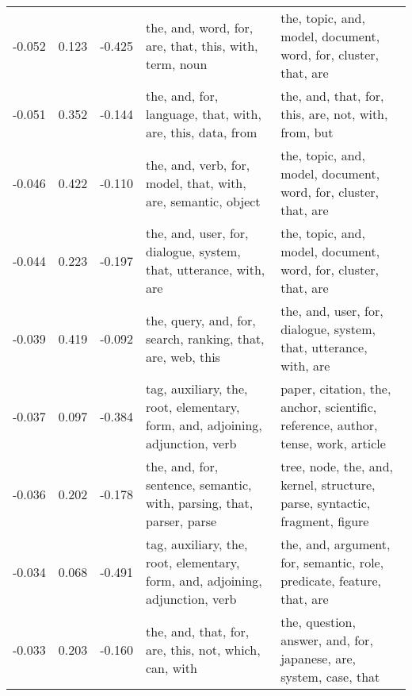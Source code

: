 \begin{tabular}{cccp{5cm}p{5cm}}
-0.052 & 0.123 & -0.425 & the, and, word, for, are, that, this, with, term, noun & the, topic, and, model, document, word, for, cluster, that, are \\
-0.051 & 0.352 & -0.144 & the, and, for, language, that, with, are, this, data, from & the, and, that, for, this, are, not, with, from, but \\
-0.046 & 0.422 & -0.110 & the, and, verb, for, model, that, with, are, semantic, object & the, topic, and, model, document, word, for, cluster, that, are \\
-0.044 & 0.223 & -0.197 & the, and, user, for, dialogue, system, that, utterance, with, are & the, topic, and, model, document, word, for, cluster, that, are \\
-0.039 & 0.419 & -0.092 & the, query, and, for, search, ranking, that, are, web, this & the, and, user, for, dialogue, system, that, utterance, with, are \\
-0.037 & 0.097 & -0.384 & tag, auxiliary, the, root, elementary, form, and, adjoining, adjunction, verb & paper, citation, the, anchor, scientific, reference, author, tense, work, article \\
-0.036 & 0.202 & -0.178 & the, and, for, sentence, semantic, with, parsing, that, parser, parse & tree, node, the, and, kernel, structure, parse, syntactic, fragment, figure \\
-0.034 & 0.068 & -0.491 & tag, auxiliary, the, root, elementary, form, and, adjoining, adjunction, verb & the, and, argument, for, semantic, role, predicate, feature, that, are \\
-0.033 & 0.203 & -0.160 & the, and, that, for, are, this, not, which, can, with & the, question, answer, and, for, japanese, are, system, case, that \\
\bottomrule
\end{tabular}
